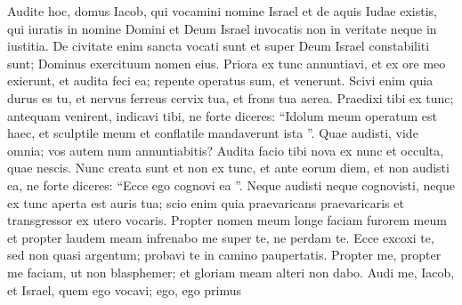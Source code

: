 \begin{biblechapter}
\begin{biblechapter}
\begin{biblechapter}
\begin{biblechapter}
\begin{biblechapter}
\begin{biblechapter}
\begin{biblechapter}
\begin{biblechapter}
\begin{biblechapter}
\begin{biblechapter}
\begin{biblechapter}
\begin{biblechapter}
\begin{biblechapter}
\begin{biblechapter}
\begin{biblechapter}
\begin{biblechapter}
\begin{biblechapter}
\begin{biblechapter}
\begin{biblechapter}
\begin{biblechapter}
\begin{biblechapter}
\begin{biblechapter}
\begin{biblechapter}
\begin{biblechapter}
\begin{biblechapter}
\begin{biblechapter}
\begin{biblechapter}
\begin{biblechapter}
\begin{biblechapter}
\begin{biblechapter}
\begin{biblechapter}
\begin{biblechapter}
\begin{biblechapter}
\begin{biblechapter}
\begin{biblechapter}
\begin{biblechapter}
\begin{biblechapter}
\begin{biblechapter}
\begin{biblechapter}
\begin{biblechapter}
\begin{biblechapter}
\begin{biblechapter}
\begin{biblechapter}
\begin{biblechapter}
\begin{biblechapter}
\begin{biblechapter}
\begin{biblechapter}
\begin{biblechapter}
\verse Audite hoc, domus Iacob,
 qui vocamini nomine Israel
 et de aquis Iudae existis,
 qui iuratis in nomine Domini
 et Deum Israel invocatis
 non in veritate neque in iustitia.
 \verse De civitate enim sancta vocati sunt
 et super Deum Israel constabiliti sunt;
 Dominus exercituum nomen eius.
 \verse Priora ex tunc annuntiavi,
 et ex ore meo exierunt,
 et audita feci ea;
 repente operatus sum, et venerunt.
 \verse Scivi enim quia durus es tu,
 et nervus ferreus cervix tua,
 et frons tua aerea.
 \verse Praedixi tibi ex tunc;
 antequam venirent, indicavi tibi,
 ne forte diceres: “Idolum meum operatum est haec,
 et sculptile meum et conflatile mandaverunt ista ”.
 \verse Quae audisti, vide omnia;
 vos autem num annuntiabitis?
 Audita facio tibi nova ex nunc
 et occulta, quae nescis.
 \verse Nunc creata sunt et non ex tunc,
 et ante eorum diem, et non audisti ea,
 ne forte diceres: “Ecce ego cognovi ea ”.
 \verse Neque audisti neque cognovisti,
 neque ex tunc aperta est auris tua;
 scio enim quia praevaricans praevaricaris
 et transgressor ex utero vocaris.
 \verse Propter nomen meum longe faciam furorem meum
 et propter laudem meam infrenabo me super te,
 ne perdam te.
 \verse Ecce excoxi te, sed non quasi argentum;
 probavi te in camino paupertatis.
 \verse Propter me, propter me faciam,
 ut non blasphemer;
 et gloriam meam alteri non dabo.
 \verse Audi me, Iacob,
 et Israel, quem ego vocavi;
 ego, ego primus

\end{biblechapter}
\end{biblechapter}
\end{biblechapter}
\end{biblechapter}
\end{biblechapter}
\end{biblechapter}
\end{biblechapter}
\end{biblechapter}
\end{biblechapter}
\end{biblechapter}
\end{biblechapter}
\end{biblechapter}
\end{biblechapter}
\end{biblechapter}
\end{biblechapter}
\end{biblechapter}
\end{biblechapter}
\end{biblechapter}
\end{biblechapter}
\end{biblechapter}
\end{biblechapter}
\end{biblechapter}
\end{biblechapter}
\end{biblechapter}
\end{biblechapter}
\end{biblechapter}
\end{biblechapter}
\end{biblechapter}
\end{biblechapter}
\end{biblechapter}
\end{biblechapter}
\end{biblechapter}
\end{biblechapter}
\end{biblechapter}
\end{biblechapter}
\end{biblechapter}
\end{biblechapter}
\end{biblechapter}
\end{biblechapter}
\end{biblechapter}
\end{biblechapter}
\end{biblechapter}
\end{biblechapter}
\end{biblechapter}
\end{biblechapter}
\end{biblechapter}
\end{biblechapter}
\end{biblechapter}
